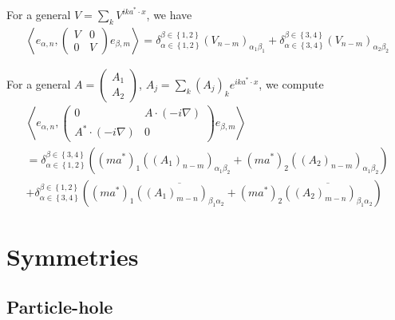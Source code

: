 \documentclass[11pt,a4paper,reqno,french,tikz]{amsart}
\newcommand{\pa}[1]{\left( #1 \right)} %
\newcommand{\acs}[1]{\left\{ #1 \right\}} %
\newcommand{\ps}[1]{\left< #1 \right>} %
\newcommand{\na}{\nabla} %
\newcommand{\mat}[1]{\begin{pmatrix} #1 \end{pmatrix}} %
\begin{document}
For a general $V = \sum_{k} V^{ik a^* \cdot x}$, we have
\begin{align*}
	\ps{e_{\alpha,n},\mat{V & 0 \\ 0 & V} e_{\beta,m}} = \delta_{\alpha \in \acs{1,2}}^{\beta \in \acs{1,2}}\pa{V_{n-m}}_{\alpha_1 \beta_1} + \delta_{\alpha \in \acs{3,4}}^{\beta \in \acs{3,4}}\pa{V_{n-m}}_{\alpha_2 \beta_2}
\end{align*}

For a general $A = \mat{A_1 \\ A_2}$, $A_j = \sum_k \pa{A_j}_k e^{ika^*\cdot x}$, we compute
\begin{multline*}
\ps{e_{\alpha,n}, \mat{0 & A \cdot \pa{-i\na} \\A^* \cdot \pa{-i\na}  & 0} e_{\beta,m}} \\
= \delta_{\alpha \in \acs{1,2}}^{\beta \in \acs{3,4}} \pa{ \pa{ma^*}_1 \pa{\pa{A_1}_{n-m}}_{\alpha_1 \beta_2} + \pa{ma^*}_2 \pa{\pa{A_2}_{n-m}}_{\alpha_1 \beta_2}}\\
+ \delta_{\alpha \in \acs{3,4}}^{\beta \in \acs{1,2}} \pa{ \pa{ma^*}_1 \overline{\pa{\pa{A_1}_{m-n}}_{\beta_1 \alpha_2}} + \pa{ma^*}_2 \overline{\pa{\pa{A_2}_{m-n}}_{\beta_1 \alpha_2}}}
\end{multline*}


\section{Symmetries}%
\label{sec:symmetries}





\subsection{Particle-hole}%
\label{sub:particle_hole}
\end{document}
